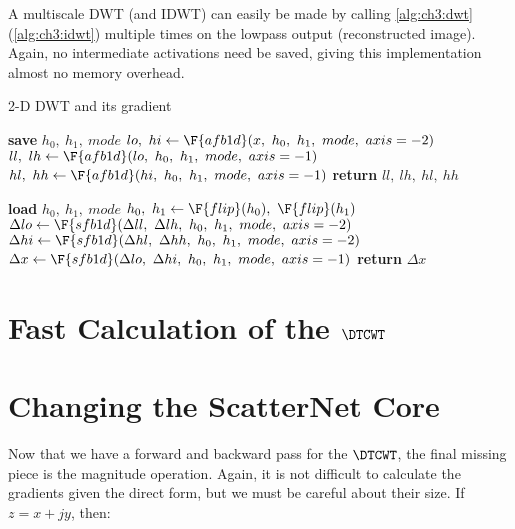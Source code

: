 A multiscale DWT (and IDWT) can easily be made by calling \autoref{alg:ch3:dwt}
(\autoref{alg:ch3:idwt}) multiple times on the lowpass output (reconstructed
image). Again, no intermediate activations need be saved, giving this
implementation almost no memory overhead.

\begin{algorithm}[tb]
\caption{2-D DWT and its gradient}\label{alg:ch3:dwt}
\begin{algorithmic}[1]
  \State \textbf{save} $h_0,\ h_1,\ mode$  \label{line:ch3:dwt_save}
  \State $lo,\ hi \gets \F{afb1d}(x,\ h_0,\ h_1,\ mode,\ axis=-2)$ 
  \State $ll,\ lh \gets \F{afb1d}(lo,\ h_0,\ h_1,\ mode,\ axis=-1)$ 
  \State $hl,\ hh \gets \F{afb1d}(hi,\ h_0,\ h_1,\ mode,\ axis=-1)$ 
  \State \textbf{return} $ll,\ lh,\ hl,\ hh$
\EndFunction
\end{algorithmic}\vspace{10pt}
\begin{algorithmic}[1]
  \State \textbf{load} $h_0,\ h_1,\ mode$
  \State $ h_0,\ h_1 \gets \F{flip}(h_0),\ \F{flip}(h_1) $
  \State $\Delta lo \gets \F{sfb1d}(\Delta ll,\ \Delta lh,\ h_0,\ h_1,\ mode,\ axis=-2) $
  \State $\Delta hi \gets \F{sfb1d}(\Delta hl,\ \Delta hh,\ h_0,\ h_1,\ mode,\ axis=-2) $
  \State $\Delta x \gets \F{sfb1d}(\Delta lo,\ \Delta hi,\ h_0,\ h_1,\ mode,\ axis=-1) $
  \State \textbf{return} $\Delta x$
\EndFunction
\end{algorithmic}
\end{algorithm}


\section{Fast Calculation of the $\DTCWT$}\label{sec:ch3:dtcwt}

\section{Changing the ScatterNet Core}\label{sec:ch3:scat}
Now that we have a forward and backward pass for the $\DTCWT$, the final missing
piece is the magnitude operation. Again, it is not difficult to calculate the
gradients given the direct form, but we must be careful about their size. If $z
= x + jy$, then:

